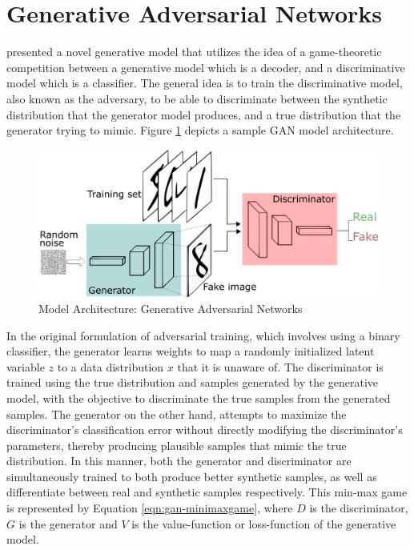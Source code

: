 \section{Generative Adversarial Networks}

\cite{goodfellow2014generative} presented a novel generative model that utilizes the idea of a game-theoretic competition between a generative model which is a decoder, and a discriminative model which is a classifier. The general idea is to train the discriminative model, also known as the adversary, to be able to discriminate between the synthetic distribution that the generator model produces, and a true distribution that the generator trying to mimic. Figure \ref{fig:gans} depicts a sample GAN model architecture.

\begin{figure}[ht]
	\centering
	\includegraphics[width=\textwidth]{images/gans}
	\caption{\label{fig:gans} Model Architecture: Generative Adversarial Networks}
\end{figure}

In the original formulation of adversarial training, which involves using a binary classifier, the generator learns weights to map a randomly initialized latent variable $z$ to a data distribution $x$ that it is unaware of. The discriminator is trained using the true distribution and samples generated by the generative model, with the objective to discriminate the true samples from the generated samples. The generator on the other hand, attempts to maximize the discriminator's classification error without directly modifying the discriminator's parameters, thereby producing plausible samples that mimic the true distribution. In this manner, both the generator and discriminator are simultaneously trained to both produce better synthetic samples, as well as differentiate between real and synthetic samples respectively. This min-max game is represented by Equation \ref{eqn:gan-minimaxgame}, where $D$ is the discriminator, $G$ is the generator and $V$ is the value-function or loss-function of the generative model.

